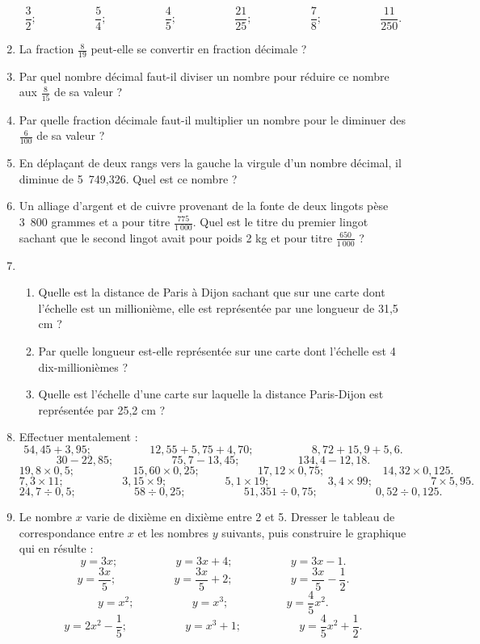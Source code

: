 \documentclass[12 pt]{report}
\theoremstyle{plain}
\newcounter{n}
\begin{document}
\begin{enumerate}
 \[\frac32; \phantom{meowmeow}
 \frac54; \phantom{meowmeow}
 \frac45; \phantom{meowmeow}
 \frac{21}{25};\phantom{meowmeow}
 \frac78; \phantom{meowmeow}
 \frac{11}{250}.\]
 \item La fraction $\frac8{19}$ peut-elle se convertir en fraction décimale ?
 \item Par quel nombre décimal faut-il diviser un nombre pour réduire ce 
 nombre aux $\frac8{15}$ de sa valeur ? 
 \item Par quelle fraction décimale faut-il multiplier un nombre pour 
 le diminuer des $\frac6{100}$ de sa valeur ? 
 \item En déplaçant de deux rangs vers la gauche la virgule d'un nombre décimal, il diminue de 5~749,326. Quel est ce nombre ? 
 \item Un alliage d'argent et de cuivre provenant de la fonte de deux lingots
 pèse 3~800 grammes et a pour titre $\frac{775}{1~000}$. Quel est le titre du 
 premier lingot sachant que le second lingot avait pour poids 2 kg et pour titre $\frac{650}{1~000}$ ? 
 \item 
 \begin{enumerate}
 \item Quelle est la distance de Paris à Dijon sachant que sur une carte dont 
 l'échelle est un millionième, elle est représentée par une longueur de 31,5 cm ? 
 \item Par quelle longueur est-elle représentée sur une carte dont l'échelle est 4 dix-millionièmes ? 
 \item Quelle est l'échelle d'une carte sur laquelle la distance Paris-Dijon est représentée par 25,2 cm ? \end{enumerate}
 \item Effectuer mentalement : 
 \[ 54,45+ 3,95 ; \phantom{meowmeow} 12,55 + 5,75+ 4,70 ; \phantom{meowmeow} 
 8,72 + 15,9 + 5,6.\]
 \[ 30 - 22,85 ; \phantom{meowmeow} 75,7 - 13,45 ;\phantom{meowmeow} 134,4 - 12,18.\]
 \[ 19,8 \times 0,5 ; \phantom{meowmeow} 15,60\times 0,25 ; \phantom{meowmeow} 17,12 \times 0,75 ; \phantom{meowmeow} 14,32\times 0,125.\]
 \[ 7,3 \times 11; \phantom{meowmeow}3,15 \times 9 ; 
 \phantom{meowmeow} 5,1 \times 19 ; \phantom{meowmeow}
 3,4 \times 99 ; \phantom{meowmeow} 7 \times 5,95.\]
 \[ 24,7 \div 0,5 ; \phantom{meowmeow} 58 \div 0,25 ; \phantom{meowmeow}
 51,351\div 0,75; \phantom{meowmeow} 0,52 \div 0,125.\]
 \item Le nombre $x$ varie de dixième en dixième entre 2 et 5. Dresser le tableau de correspondance entre $x$ et les nombres $y$ suivants, puis construire le graphique qui en résulte : 
 \[ y = 3x; \phantom{meowmeow} y = 3x+4; \phantom{meowmeow} y=3x-1.\]
 \[ y = \frac{3x}5; \phantom{meowmeow}y = \frac{3x}5 + 2; \phantom{meowmeow}
 y = \frac{3x}5 - \frac12.\]
 \[ y = x^2; \phantom{meowmeow} y = x^3; \phantom{meowmeow} y = \frac45x^2.\]
 \[ y = 2x^2 - \frac15; \phantom{meowmeow} 
 y = x^3 + 1; \phantom{meowmeow} y = \frac45 x^2 + \frac12.\]
 
 \end{enumerate}
 
\end{document}
